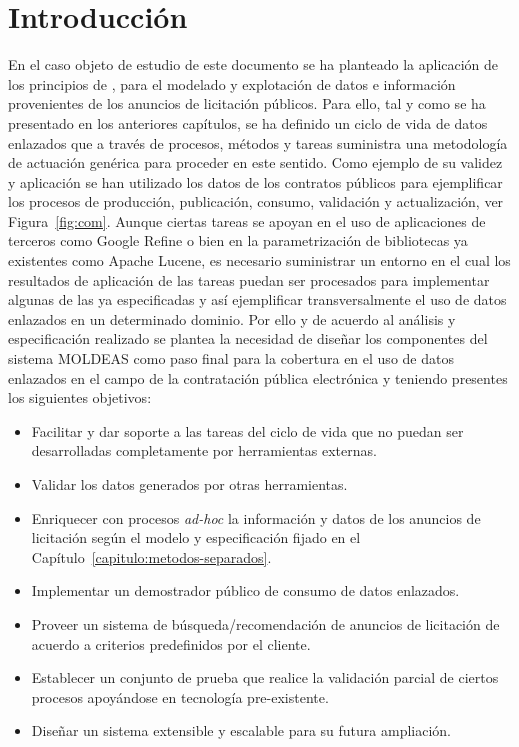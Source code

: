 \section{Introducción}
En el caso objeto de estudio de este documento se ha planteado la aplicación de los principios 
de \linkeddata, para el modelado y explotación de datos e información provenientes de los anuncios de 
licitación públicos. Para ello, tal y como se ha presentado en los anteriores capítulos, se ha definido 
un ciclo de vida de datos enlazados que a través de procesos, métodos y tareas suministra una metodología 
de actuación genérica para proceder en este sentido. Como ejemplo de su validez y aplicación se han utilizado 
los datos de los contratos públicos para ejemplificar los procesos de producción, publicación, consumo, validación y 
actualización, ver Figura~\ref{fig:com}. Aunque ciertas tareas se apoyan en el uso de aplicaciones de terceros como Google Refine o bien 
en la parametrización de bibliotecas ya existentes como Apache Lucene, es necesario suministrar un entorno 
en el cual los resultados de aplicación de las tareas puedan ser procesados para implementar algunas de las ya 
especificadas y así ejemplificar transversalmente el uso de datos enlazados en un determinado dominio. Por ello y 
de acuerdo al análisis y especificación realizado se plantea la necesidad de diseñar los componentes del sistema 
MOLDEAS como paso final para la cobertura en el uso de datos enlazados en el campo de la contratación pública 
electrónica y teniendo presentes los siguientes objetivos:

\begin{itemize}
 \item Facilitar y dar soporte a las tareas del ciclo de vida que no puedan ser desarrolladas completamente 
por herramientas externas.
\item Validar los datos generados por otras herramientas.
\item Enriquecer con procesos \textit{ad-hoc} la información y datos de los anuncios de licitación según el modelo 
y especificación fijado en el Capítulo~\ref{capitulo:metodos-separados}.
\item Implementar un demostrador público de consumo de datos enlazados.
\item Proveer un sistema de búsqueda/recomendación de anuncios de licitación de acuerdo a criterios predefinidos 
por el cliente.
\item Establecer un conjunto de prueba que realice la validación parcial de ciertos procesos apoyándose en tecnología 
pre-existente.
\item Diseñar un sistema extensible y escalable para su futura ampliación.
\end{itemize}

